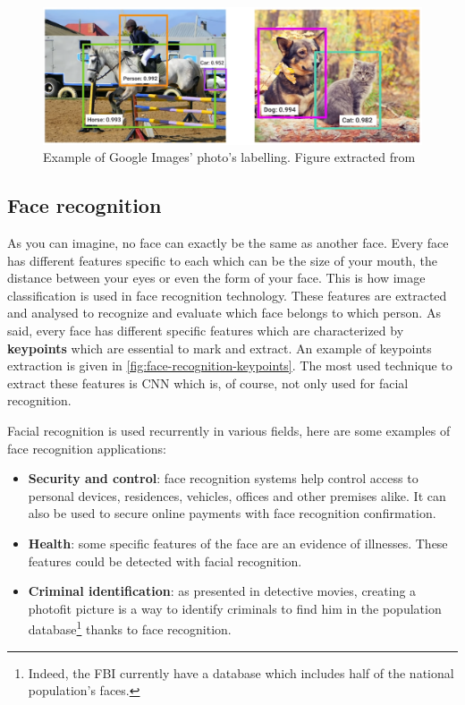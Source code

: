 \documentclass[11pt, openany]{report}
\theoremstyle{plain}
\theoremstyle{definition}
\theoremstyle{remark}
\begin{document}
\begin{figure}[h]
  \centering
  \includegraphics[scale=0.3]{figures/googleImages-ex-labeling.png}
  \caption{Example of Google Images' photo's labelling. Figure extracted from \cite{Google-2}}
  \label{fig:googleImages-ex-labelling}
\end{figure}


\newpage
\subsection{Face recognition}
As you can imagine, no face can exactly be the same as another face. Every face has different features specific to each which can be the size of your mouth, the distance between your eyes or even the form of your face. This is how image classification is used in face recognition technology. These features are extracted and analysed to recognize and evaluate which face belongs to which person. As said, every face has different specific features which are characterized by \textbf{keypoints} which are essential to mark and extract. An example of keypoints extraction is given in \autoref{fig:face-recognition-keypoints}. The most used technique to extract these features is CNN which is, of course, not only used for facial recognition. 

Facial recognition is used recurrently in various fields, here are some examples of face recognition applications:  
\begin{itemize}
\item \textbf{Security and control}: face recognition systems help control access to personal devices, residences, vehicles, offices and other premises alike. It can also be used to secure online payments with face recognition confirmation. 
\item \textbf{Health}: some specific features of the face are an evidence of illnesses. These features could be detected with facial recognition. 
\item \textbf{Criminal identification}: as presented in detective movies, creating a photofit picture is a way to identify criminals to find him in the population database\footnote{Indeed, the FBI currently have a database which includes half of the national population's faces.} thanks to face recognition.    
\end{itemize}
\end{document}
